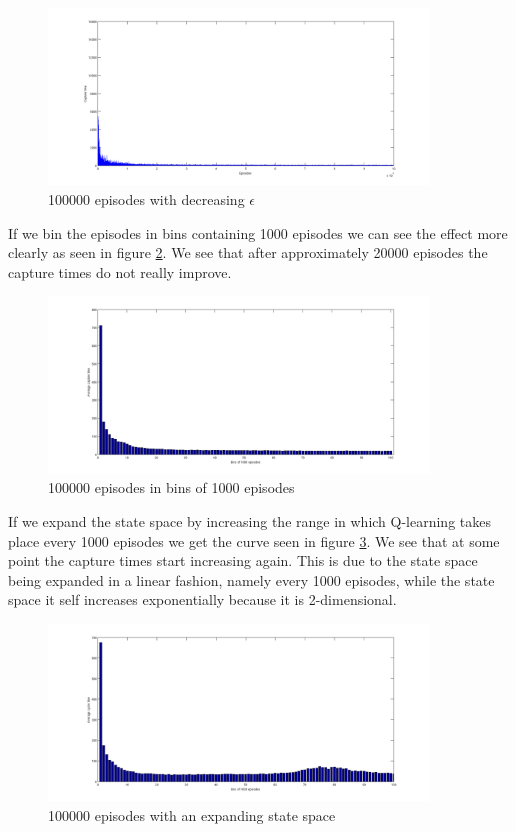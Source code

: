 \documentclass[10pt]{article}
\begin{document}
\begin{figure}[h!tb]
\centering
\includegraphics[width=0.9\textwidth]{img/sarsa1_explo_noexpan}
\caption{100000 episodes with decreasing $\epsilon$}
\label{sarsa1}
\end{figure}

If we bin the episodes in bins containing 1000 episodes we can see the effect more clearly as seen in figure \ref{sarsa1bins}. We see that after approximately 20000 episodes the capture times do not really improve. 

\begin{figure}[h!tb]
\centering
\includegraphics[width=0.9\textwidth]{img/sarsa_explor}
\caption{100000 episodes in bins of 1000 episodes}
\label{sarsa1bins}
\end{figure}

If we expand the state space by increasing the range in which Q-learning takes place every 1000 episodes we get the curve seen in figure \ref{expan}. We see that at some point the capture times start increasing again. This is due to the state space being expanded in a linear fashion, namely every 1000 episodes, while the state space it self increases exponentially because it is 2-dimensional.

\begin{figure}[h!tb]
\centering
\includegraphics[width=0.9\textwidth]{img/expansion}
\caption{100000 episodes with an expanding state space}
\label{expan}
\end{figure}
\end{document}

